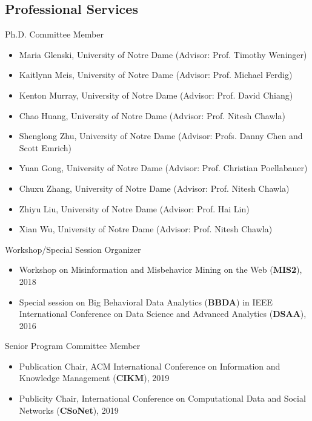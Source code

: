\documentclass[margin, 9pt]{res}
\begin{document}
\begin{resume}
\section{Professional Services}

{Ph.D. Committee Member}
\begin{itemize}
\item Maria Glenski, University of Notre Dame (Advisor: Prof. Timothy Weninger)
\item Kaitlynn Meis, University of Notre Dame (Advisor: Prof. Michael Ferdig)
\item Kenton Murray, University of Notre Dame (Advisor: Prof. David Chiang)	
\item Chao Huang, University of Notre Dame (Advisor: Prof. Nitesh Chawla)
\item Shenglong Zhu, University of Notre Dame (Advisor: Profs. Danny Chen and Scott Emrich)
\item Yuan Gong, University of Notre Dame (Advisor: Prof. Christian Poellabauer)
\item Chuxu Zhang, University of Notre Dame (Advisor: Prof. Nitesh Chawla)
\item Zhiyu Liu, University of Notre Dame (Advisor: Prof. Hai Lin)
\item Xian Wu, University of Notre Dame (Advisor: Prof. Nitesh Chawla)
\end{itemize}
\vspace{-0.1in}

{Workshop/Special Session Organizer}
\begin{itemize}
\item Workshop on Misinformation and Misbehavior Mining on the Web (\textbf{MIS2}), 2018
\item Special session on Big Behavioral Data Analytics (\textbf{BBDA})
	in IEEE International Conference on Data Science and Advanced Analytics (\textbf{DSAA}), 2016
\end{itemize}
\vspace{-0.1in}

{Senior Program Committee Member}
\begin{itemize}
\item {Publication Chair}, ACM International Conference on Information and Knowledge Management (\textbf{CIKM}), 2019
\item {Publicity Chair}, International Conference on Computational Data and Social Networks (\textbf{CSoNet}), 2019
\end{itemize}
\vspace{-0.1in}


\end{resume}
\end{document}
